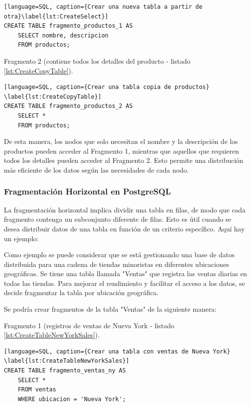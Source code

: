 \begin{lstlisting}[language=SQL, caption={Crear una nueva tabla a partir de otra}\label{lst:CreateSelect}]
CREATE TABLE fragmento_productos_1 AS
	SELECT nombre, descripcion
	FROM productos;
\end{lstlisting}

Fragmento 2 (contiene todos los detalles del producto - listado \ref{lst:CreateCopyTable}).

\begin{lstlisting}[language=SQL, caption={Crear una tabla copia de productos} \label{lst:CreateCopyTable}]
CREATE TABLE fragmento_productos_2 AS
	SELECT *
	FROM productos;
\end{lstlisting}

De esta manera, los nodos que solo necesitan el nombre y la descripción de los productos pueden acceder al Fragmento 1, mientras que aquellos que requieren todos los detalles pueden acceder al Fragmento 2. Esto permite una distribución más eficiente de los datos según las necesidades de cada nodo.

\subsubsection{Fragmentación Horizontal en PostgreSQL}
\noindent
La fragmentación horizontal implica dividir una tabla en filas, de modo que cada fragmento contenga un subconjunto diferente de filas. Esto es útil cuando se desea distribuir datos de una tabla en función de un criterio específico. Aquí hay un ejemplo:

Como ejemplo se puede considerar que se está gestionando una base de datos distribuida para una cadena de tiendas minoristas en diferentes ubicaciones geográficas. Se tiene una tabla llamada "Ventas" que registra las ventas diarias en todas las tiendas. Para mejorar el rendimiento y facilitar el acceso a los datos, se decide fragmentar la tabla por ubicación geográfica.

Se podría crear fragmentos de la tabla "Ventas" de la siguiente manera:

Fragmento 1 (registros de ventas de Nueva York - listado \ref{lst:CreateTableNewYorkSales}).

\begin{lstlisting}[language=SQL, caption={Crear una tabla con ventas de Nueva York} \label{lst:CreateTableNewYorkSales}]
CREATE TABLE fragmento_ventas_ny AS
	SELECT *
	FROM ventas
	WHERE ubicacion = 'Nueva York';
\end{lstlisting}

